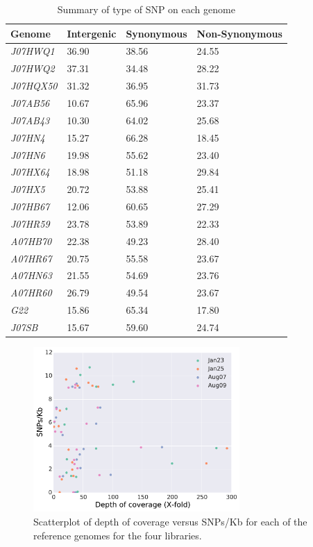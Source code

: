 \begin{table}[ht]
  \caption{Summary of type of SNP on each genome}
  \begin{tabularx}{\textwidth}{L{2.1cm}R{2.3cm}R{3cm}R{3.8cm}}
  \hline
    \textbf{Genome} & \textbf{Intergenic} & \textbf{Synonymous} & \textbf{Non-Synonymous}\\
    \hline
     \textit{J07HWQ1} & 36.90 & 38.56 & 24.55 \\
     \textit{J07HWQ2} & 37.31 & 34.48 & 28.22 \\
     \textit{J07HQX50} & 31.32 & 36.95 & 31.73 \\
     \textit{J07AB56} & 10.67 & 65.96 & 23.37 \\
     \textit{J07AB43} & 10.30 & 64.02 & 25.68 \\
     \textit{J07HN4} & 15.27 & 66.28 & 18.45 \\
     \textit{J07HN6} &  19.98 & 55.62 & 23.40\\
     \textit{J07HX64} & 18.98 & 51.18 & 29.84 \\
     \textit{J07HX5} & 20.72 & 53.88 & 25.41 \\
     \textit{J07HB67} & 12.06 & 60.65 & 27.29 \\
     \textit{J07HR59} & 23.78 & 53.89 & 22.33 \\
     \textit{A07HB70} & 22.38 & 49.23 & 28.40 \\
     \textit{A07HR67} & 20.75 & 55.58 & 23.67 \\
     \textit{A07HN63} & 21.55 & 54.69 & 23.76 \\
     \textit{A07HR60} & 26.79 & 49.54 & 23.67 \\
     \textit{G22} & 15.86 & 65.34 & 17.80 \\
     \textit{J07SB} & 15.67 & 59.60 & 24.74 \\     
  \end{tabularx}
  \label{TypeSNP_SummaryGenome}
\end{table}

\begin{figure}[h]
  \centering
  \includegraphics[width=0.7\textwidth,height=\textheight,keepaspectratio]{Chapter5/Figures/DepthCoverage_VS_SNPsKB.pdf}
  \caption{Scatterplot of depth of coverage versus SNPs/Kb for each of the reference genomes for the four libraries.}
  \label{SNPsCoverage}
\end{figure}

